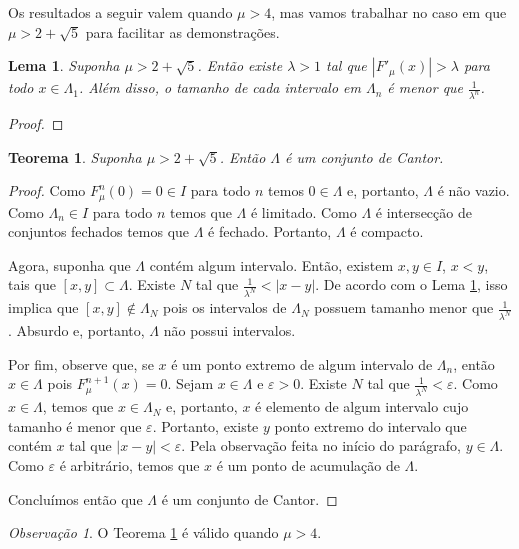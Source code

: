\documentclass[a4paper, 12pt]{article}
\theoremstyle{definition}
\theoremstyle{plain}
\theoremstyle{plain}
\newtheorem{lemma}[definition]{Lema}
\theoremstyle{plain}
\newtheorem{theorem}[definition]{Teorema}
\theoremstyle{remark}
\newtheorem*{remark}{Observação}
\begin{document}
Os resultados a seguir valem quando $\mu > 4$, mas vamos trabalhar no caso em que $\mu > 2 + \sqrt{5}$ para facilitar as demonstrações.

\begin{lemma}
Suponha $\mu > 2 + \sqrt{5}$. Então existe $\lambda > 1$ tal que $|F'_\mu (x)| > \lambda$ para todo $x \in \Lambda_1$. Além disso, o tamanho de cada intervalo em $\Lambda_n$ é menor que $\frac{1}{\lambda^n}$.
\end{lemma}

\begin{proof}

\end{proof}

\begin{theorem}
\label{Lambda is Cantor}
Suponha $\mu > 2 + \sqrt{5}$. Então $\Lambda$ é um conjunto de Cantor.
\end{theorem}

\begin{proof}
Como $F^n_\mu(0) = 0 \in I$ para todo $n$ temos $0 \in \Lambda$ e, portanto, $\Lambda$ é não vazio. Como $\Lambda_n \in I$ para todo $n$ temos que $\Lambda$ é limitado. Como $\Lambda$ é intersecção de conjuntos fechados  temos que $\Lambda$ é fechado. Portanto, $\Lambda$ é compacto.

Agora, suponha que $\Lambda$ contém algum intervalo. Então, existem $x, y \in I$, $x < y$, tais que $[x, y] \subset \Lambda$. Existe $N$ tal que $\frac{1}{\lambda^N} < |x - y|$. De acordo com o Lema \ref{Lambda is Cantor}, isso implica que $[x, y] \notin \Lambda_N$ pois os intervalos de $\Lambda_N$ possuem tamanho menor que $\frac{1}{\lambda^N}$. Absurdo e, portanto, $\Lambda$ não possui intervalos.

Por fim, observe que, se $x$ é um ponto extremo de algum intervalo de $\Lambda_n$, então $x \in \Lambda$ pois $F^{n+1}_\mu (x) = 0$. Sejam $x \in \Lambda$ e $\varepsilon > 0$.  Existe $N$ tal que $\frac{1}{\lambda^N} < \varepsilon$. Como $x \in \Lambda$, temos que $x \in \Lambda_N$ e, portanto, $x$ é elemento de algum intervalo cujo tamanho é menor que $\varepsilon$. Portanto, existe $y$ ponto extremo do intervalo que contém $x$ tal que $|x - y| < \varepsilon$. Pela observação feita no início do parágrafo, $y \in \Lambda$. Como $\varepsilon$ é arbitrário, temos que $x$ é um ponto de acumulação de $\Lambda$.

Concluímos então que $\Lambda$ é um conjunto de Cantor.
\end{proof}

\begin{remark}
O Teorema \ref{Lambda is Cantor} é válido quando $\mu > 4$.
\end{remark}
\end{document}

